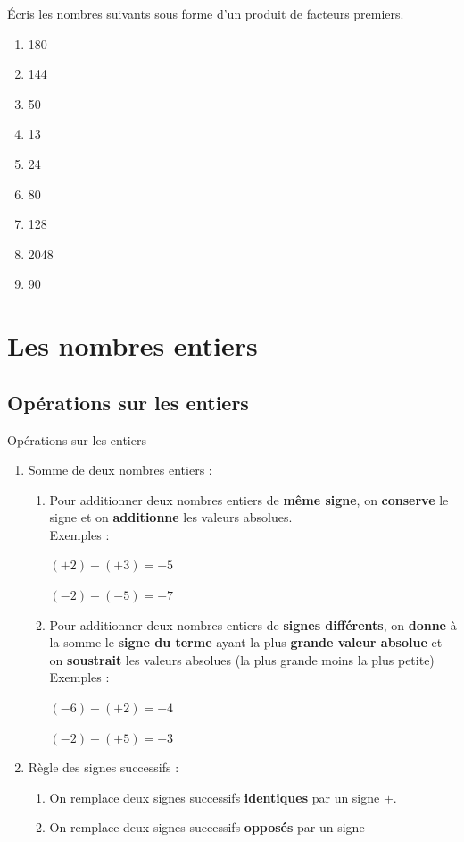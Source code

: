 \documentclass[10pt,a4paper]{article}
\begin{document}
\begin{exercise}
	Écris les nombres suivants sous forme d'un produit de facteurs premiers.
	\begin{enumerate}[cols=3]
		\item 180
		\item 144
		\item 50
		\item 13
		\item 24
		\item 80
		\item 128
		\item 2048
		\item 90
	\end{enumerate}
\end{exercise}

\section{Les nombres entiers}
	 \subsection{Opérations sur les entiers}
		\begin{bclogo}[arrondi=0.3,logo=\bccle]{Opérations sur les entiers}
			\begin{enumerate}[label=\arabic*)]
				\item Somme de deux nombres entiers :
				\begin{enumerate}
					\item Pour additionner deux nombres entiers de \textbf{même signe}, on \textbf{conserve} le signe et on \textbf{additionne} les valeurs absolues.\\
					Exemples : 
					\parbox{0.3\linewidth}{$(+2)+(+3)=+5$}
					\parbox{0.3\linewidth}{$(-2)+(-5)=-7$}
					\item Pour additionner deux nombres entiers de \textbf{signes différents}, on \textbf{donne} à la somme le \textbf{signe du terme} ayant la plus \textbf{grande valeur absolue} et on \textbf{soustrait} les valeurs absolues (la plus grande moins la plus petite)\\
					Exemples :
					\parbox{0.3\linewidth}{$(-6)+(+2)=-4$}
					\parbox{0.3\linewidth}{$(-2)+(+5)=+3$}
				\end{enumerate}
				\item Règle des signes successifs :
				\begin{enumerate}
					\item On remplace deux signes successifs \textbf{identiques} par un signe \textbf{$+$}.
					\item On remplace deux signes successifs \textbf{opposés} par un signe \textbf{$-$}
				\end{enumerate}
			\end{enumerate}
		\end{bclogo}
\end{document}

